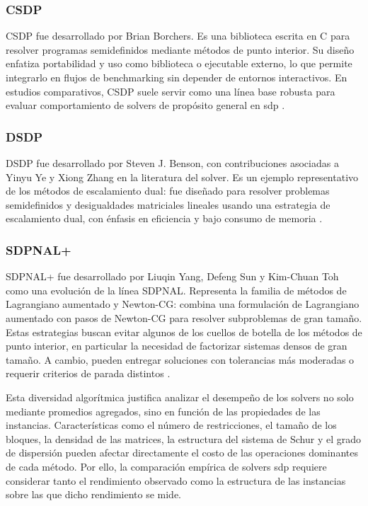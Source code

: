 \subsubsection{CSDP}
\label{subsec:solver_csdp}

CSDP fue desarrollado por Brian Borchers. Es una biblioteca escrita en C para resolver programas
semidefinidos mediante métodos de punto interior. Su diseño enfatiza portabilidad y uso como
biblioteca o ejecutable externo, lo que permite integrarlo en flujos de benchmarking sin depender
de entornos interactivos. En estudios comparativos, CSDP suele servir como una línea base
robusta para evaluar comportamiento de solvers de propósito general en \acrshort{sdp}
\cite{borchersCSDPLibrarySemidefinite1999}.

\subsubsection{DSDP}
\label{subsec:solver_dsdp}

DSDP fue desarrollado por Steven J. Benson, con contribuciones asociadas a Yinyu Ye y Xiong
Zhang en la literatura del solver. Es un ejemplo representativo de los métodos de escalamiento
dual: fue diseñado para resolver problemas semidefinidos y desigualdades matriciales lineales
usando una estrategia de escalamiento dual, con énfasis en eficiencia y bajo consumo de memoria
\cite{bensonAlgorithm875DSDP5software2008}.

\subsubsection{SDPNAL+}
\label{subsec:solver_sdpnal}

SDPNAL+ fue desarrollado por Liuqin Yang, Defeng Sun y Kim-Chuan Toh como una evolución de
la línea SDPNAL. Representa la familia de métodos de Lagrangiano aumentado y Newton-CG:
combina una formulación de Lagrangiano aumentado con pasos de Newton-CG para resolver
subproblemas de gran tamaño. Estas estrategias buscan evitar algunos de los cuellos de botella
de los métodos de punto interior, en particular la necesidad de factorizar sistemas densos de
gran tamaño. A cambio, pueden entregar soluciones con tolerancias más moderadas o requerir
criterios de parada distintos \cite{sunSDPNALMatlabSoftware2019}.

\vspace*{2em}

Esta diversidad algorítmica justifica analizar el desempeño de los solvers no solo mediante
promedios agregados, sino en función de las propiedades de las instancias. Características como
el número de restricciones, el tamaño de los bloques, la densidad de las matrices, la estructura
del sistema de Schur y el grado de dispersión pueden afectar directamente el costo de las
operaciones dominantes de cada método. Por ello, la comparación empírica de solvers
\acrshort{sdp} requiere considerar tanto el rendimiento observado como la estructura de las
instancias sobre las que dicho rendimiento se mide.


